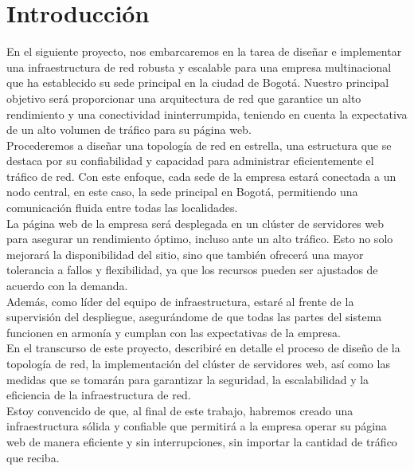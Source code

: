 \section{Introducción}

En el siguiente proyecto, nos embarcaremos en la tarea de diseñar e implementar
una infraestructura de red robusta y escalable para una empresa multinacional
que ha establecido su sede principal en la ciudad de Bogotá. Nuestro principal
objetivo será proporcionar una arquitectura de red que garantice un alto
rendimiento y una conectividad ininterrumpida, teniendo en cuenta la
expectativa de un alto volumen de tráfico para su página web.
\\

Procederemos a diseñar una topología de red en estrella, una estructura que se
destaca por su confiabilidad y capacidad para administrar eficientemente el
tráfico de red. Con este enfoque, cada sede de la empresa estará conectada a un
nodo central, en este caso, la sede principal en Bogotá, permitiendo una
comunicación fluida entre todas las localidades.
\\

La página web de la empresa será desplegada en un clúster de servidores web
para asegurar un rendimiento óptimo, incluso ante un alto tráfico. Esto no
solo mejorará la disponibilidad del sitio, sino que también ofrecerá una mayor
tolerancia a fallos y flexibilidad, ya que los recursos pueden ser ajustados de
acuerdo con la demanda.
\\

Además, como líder del equipo de infraestructura, estaré al frente de la
supervisión del despliegue, asegurándome de que todas las partes del sistema
funcionen en armonía y cumplan con las expectativas de la empresa.
\\

En el transcurso de este proyecto, describiré en detalle el proceso de diseño
de la topología de red, la implementación del clúster de servidores web, así
como las medidas que se tomarán para garantizar la seguridad, la escalabilidad
y la eficiencia de la infraestructura de red.
\\

Estoy convencido de que, al final de este trabajo, habremos creado una
infraestructura sólida y confiable que permitirá a la empresa operar su página
web de manera eficiente y sin interrupciones, sin importar la cantidad de
tráfico que reciba.